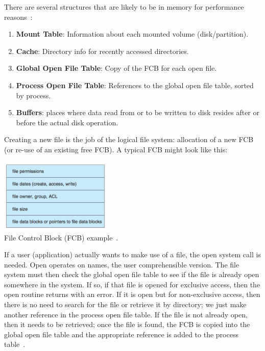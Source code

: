 There are several structures that are likely to be in memory for performance reasons~\cite{osc}:

\begin{enumerate}
	\item \textbf{Mount Table}: Information about each mounted volume (disk/partition).
	\item \textbf{Cache}: Directory info for recently accessed directories.
	\item \textbf{Global Open File Table}: Copy of the FCB for each open file.
	\item \textbf{Process Open File Table}: References to the global open file table, sorted by process.
	\item \textbf{Buffers}: places where data read from or to be written to disk resides after or before the actual disk operation.
\end{enumerate}

Creating a new file is the job of the logical file system: allocation of a new FCB (or re-use of an existing free FCB). A typical FCB might look like this:

\begin{center}
	\includegraphics[width=0.4\textwidth]{images/fcb.png}\\
	File Control Block (FCB) example~\cite{osc}.
\end{center}

If a user (application) actually wants to make use of a file, the open system call is needed. Open operates on names, the user comprehensible version. The file system must then check the global open file table to see if the file is already open somewhere in the system. If so, if that file is opened for exclusive access, then the open routine returns with an error. If it is open but for non-exclusive access, then there is no need to search for the file or retrieve it by directory; we just make another reference in the process open file table. If the file is not already open, then it needs to be retrieved; once the file is found, the FCB is copied into the global open file table and the appropriate reference is added to the process table~\cite{osc}.

